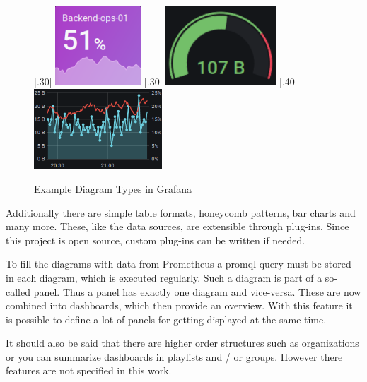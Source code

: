 \begin{figure}[!ht]
	[.30\textwidth]{%
		\centering
		\includegraphics[height=3cm]{assets/screenshots/Screenshot_2020-12-08 1 - New Features in v7 0 - Grafana.png}
	}%
	[.30\textwidth]{%
		\centering
		\includegraphics[height=3cm]{assets/screenshots/Screenshot_2020-12-08 Website trends - Grafana.png}
	}%
	[.40\textwidth]{%
		\centering
		\includegraphics[height=3cm]{assets/screenshots/Screenshot_2020-12-08 Grafana Play Home - Grafana(2).png}
	}%
	\caption{Example Diagram Types in Grafana}
	\label{fig:example_grafana_graph}
\end{figure}

Additionally there are simple table formats, honeycomb patterns, bar charts and many more. These, like the data sources, are extensible through plug-ins. Since this project is open source, custom plug-ins can be written if needed.

To fill the diagrams with data from Prometheus a \gls{promql} query must be stored in each diagram, which is executed regularly. Such a diagram is part of a so-called panel. Thus a panel has exactly one diagram and vice-versa. These are now combined into dashboards, which then provide an overview. With this feature it is possible to define a lot of panels for getting displayed at the same time.

It should also be said that there are higher order structures such as organizations or you can summarize dashboards in playlists and / or groups. However there features are not specified in this work.

